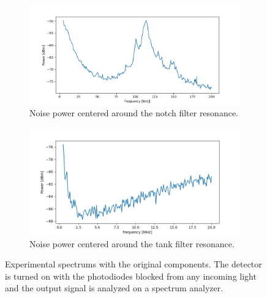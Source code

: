 \documentclass[11pt]{report}
\begin{document}
\begin{figure}[h!]
\centering
\begin{subfigure}{.45\textwidth}
  \centering
  \includegraphics[width=1.1\linewidth]{opick}
  \caption{Noise power centered around the notch filter resonance.}
  \label{fig:opeak}
\end{subfigure}%
\hspace{1em}%
\begin{subfigure}{.45\textwidth}
  \centering
  \includegraphics[width=1.1\linewidth]{odeep}
  \caption{Noise power centered around the tank filter resonance.}
  \label{fig:odeep}
\end{subfigure}
\caption{Experimental spectrums with the original components. The detector is turned on with the photodiodes blocked from any incoming light and the output signal is analyzed on a spectrum analyzer.}
\label{fig:exp_spec_o}
\end{figure}
\end{document}
